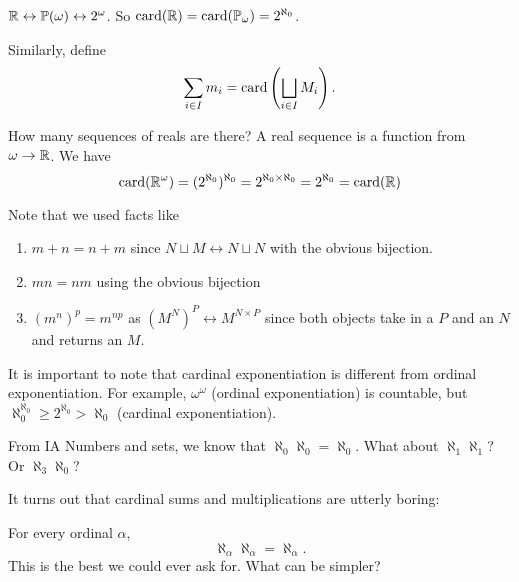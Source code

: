 \documentclass[a4paper]{article}
\begin{document}
\begin{eg}
  $\mathbb{R} \leftrightarrow \mathbb{P}(\omega) \leftrightarrow 2^\omega$. So $\operatorname{card}(\mathbb{R}) = \operatorname{card}(\mathbb{P}_\omega) = 2^{\aleph_0}$.
\end{eg}

Similarly, define
\[
  \sum_{i \in I} m_i = \operatorname{card}\left(\bigsqcup_{i\in I} M_i\right).
\]

\begin{eg}
  How many sequences of reals are there? A real sequence is a function from $\omega \to \mathbb{R}$. We have
  \[
    \operatorname{card}(\mathbb{R}^\omega) = (2^{\aleph_0})^{\aleph_0} = 2^{\aleph_0 \times \aleph_0} = 2^{\aleph_0} = \operatorname{card}(\mathbb{R})
  \]
\end{eg}
Note that we used facts like
\begin{prop}\leavevmode
  \begin{enumerate}
    \item $m + n = n + m$ since $N\sqcup M \leftrightarrow N\sqcup N$ with the obvious bijection.
    \item $mn = nm$ using the obvious bijection
    \item $(m^n)^p = m^{np}$ as $(M^N)^P \leftrightarrow M^{N\times P}$ since both objects take in a $P$ and an $N$ and returns an $M$.
  \end{enumerate}
\end{prop}
It is important to note that cardinal exponentiation is different from ordinal exponentiation. For example, $\omega^\omega$ (ordinal exponentiation) is countable, but $\aleph_0^{\aleph_0} \geq 2^{\aleph_0} > \aleph_0$ (cardinal exponentiation).

From IA Numbers and sets, we know that $\aleph_0 \aleph_0 = \aleph_0$. What about $\aleph_1 \aleph_1$? Or $\aleph_3 \aleph_0$?

It turns out that cardinal sums and multiplications are utterly boring:
\begin{thm}
  For every ordinal $\alpha$,
  \[
    \aleph_\alpha \aleph_\alpha = \aleph_\alpha.
  \]
  This is the best we could ever ask for. What can be simpler?
\end{thm}
\end{document}
